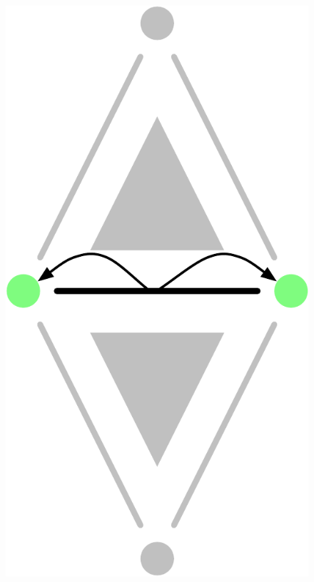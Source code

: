 \begin{figure}[tbp]
{\includegraphics[scale=0.18]{figs/1-simplex-boundary}}
\quad
\subfloat[]{
}
\end{figure}
